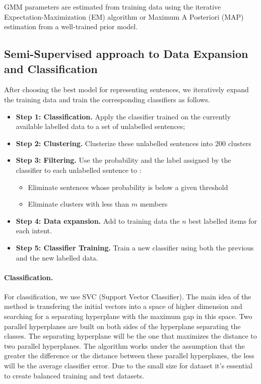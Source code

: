\documentclass[11pt]{article}
\begin{document}
GMM parameters are estimated from training data using the iterative Expectation-Maximization (EM) algorithm or Maximum A Posteriori (MAP) estimation from a well-trained prior model.



\subsection{Semi-Supervised approach to Data Expansion and Classification}
\label{subsec:dataexpansion}

After choosing the best model for representing sentences, we
iteratively expand the training data and train the corresponding
classifiers as follows.


\begin{itemize}
\item \textbf{Step 1: Classification.} Apply the classifier trained on the currently available labelled data to a set of unlabelled sentences;
\item \textbf{Step 2: Clustering.} Clusterize these unlabelled sentences into 200 clusters
\item \textbf{Step 3: Filtering.} Use the probability and the label assigned by the classifier to each unlabelled sentence to :
  \begin{itemize}
\item Eliminate sentences whose probability is below a given threshold
\item Eliminate clusters with less than $m$ members
  \end{itemize}
\item \textbf{Step 4: Data expansion.} Add to training data the $n$ best labelled items for each intent. 
  \item \textbf{Step 5: Classifier Training.} Train a new classifier using both the previous and the new labelled data. 
\end{itemize}

\paragraph{Classification.} For classification, we use SVC (Support Vector Classifier). The main idea of ​​the method is transfering the initial vectors into a space of higher dimension and searching for a separating hyperplane with the maximum gap in this space. Two parallel hyperplanes are built on both sides of the hyperplane separating the classes. The separating hyperplane will be the one that maximizes the distance to two parallel hyperplanes. The algorithm works under the assumption that the greater the difference or the distance between these parallel hyperplanes, the less will be the average classifier error.  Due to the small size for dataset it's essential to create balanced training and test datasets.
\end{document}
